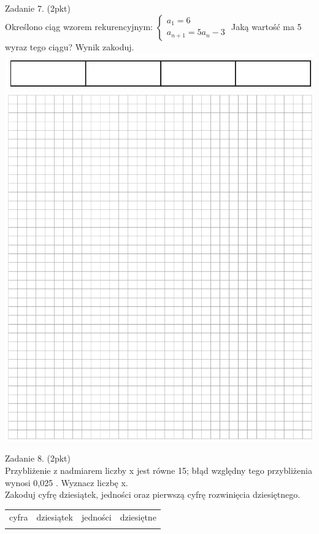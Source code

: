 \documentclass[10pt]{article}
\begin{document}
Zadanie 7. (2pkt)\\
Określono ciąg wzorem rekurencyjnym: \(\left\{\begin{array}{l}a_{1}=6 \\ a_{n+1}=5 a_{n}-3\end{array}\right.\) Jaką wartość ma 5 wyraz tego ciągu? Wynik zakoduj.\\
\includegraphics[max width=\textwidth, center]{2024_11_21_caad0d2d07cc5c30818fg-05}\\
\includegraphics[max width=\textwidth, center]{2024_11_21_caad0d2d07cc5c30818fg-05(1)}

Zadanie 8. (2pkt)\\
Przybliżenie z nadmiarem liczby x jest równe 15; błąd względny tego przybliżenia wynosi 0,025 . Wyznacz liczbę x.\\
Zakoduj cyfrę dziesiątek, jedności oraz pierwszą cyfrę rozwinięcia dziesiętnego.

\begin{center}
\begin{tabular}{|c|c|c|c|}
\hline
cyfra & dziesiątek & jedności & dziesiętne \\
\cline { 2 - 4 }
 &  &  &  \\
\hline
\end{tabular}
\end{center}
\end{document}
